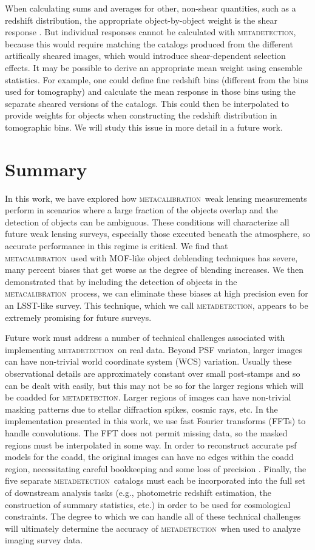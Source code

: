 \documentclass[fleqn,useAMS,usenatbib]{mnras}
\newcommand{\mcal}{\textsc{metacalibration}}
\newcommand{\mdet}{\textsc{metadetection}}
\begin{document}
When calculating sums and averages for other, non-shear quantities, such as a
redshift distribution, the appropriate object-by-object weight is the shear
response \citep{SheldonMcal2017}.  But individual responses cannot be
calculated with \mdet, because this would require matching the catalogs
produced from the different artifically sheared images, which would introduce
shear-dependent selection effects.  It may be possible to derive an appropriate
mean weight using ensemble statistics.  For example, one could define fine
redshift bins (different from the bins used for tomography) and calculate the
mean response in those bins using the separate sheared versions of the
catalogs. This could then be interpolated to provide weights for objects when
constructing the redshift distribution in tomographic bins.  We will study this
issue in more detail in a future work.


\section{Summary}\label{sec:conc}

In this work, we have explored how \mcal\ weak lensing measurements perform in
scenarios where a large fraction of the objects overlap and the detection of
objects can be ambiguous. These conditions will characterize all future weak
lensing surveys, especially those executed beneath the atmosphere, so accurate
performance in this regime is critical. We find that \mcal\ used with MOF-like
object deblending techniques has severe, many percent biases that get worse as
the degree of blending increases. We then demonstrated that by including the
detection of objects in the \mcal\ process, we can eliminate these biases at
high precision even for an LSST-like survey. This technique, which we call
\mdet, appears to be extremely promising for future surveys.

Future work must address a number of technical challenges associated with
implementing \mdet\ on real data. Beyond PSF variaton, larger images can have
non-trivial world coordinate system (WCS) variation.  Usually these
observational details are approximately constant over small post-stamps and so
can be dealt with easily, but this may not be so for the larger regions which
will be coadded for \mdet. Larger regions of images can have non-trivial
masking patterns due to stellar diffraction spikes, cosmic rays, etc. In the
implementation presented in this work, we use fast Fourier transforms (FFTs) to
handle convolutions. The FFT does not permit missing data, so the masked
regions must be interpolated in some way.  In order to reconstruct accurate psf
models for the coadd, the original images can have no edges within the coadd
region, necessitating careful bookkeeping and some loss of precision
\citep{ArmstrongCoadd}.  Finally, the five separate \mdet\ catalogs must each
be incorporated into the full set of downstream analysis tasks (e.g.,
photometric redshift estimation, the construction of summary statistics, etc.)
in order to be used for cosmological constraints. The degree to which we can
handle all of these technical challenges will ultimately determine the accuracy
of \mdet\ when used to analyze imaging survey data.
\end{document}

